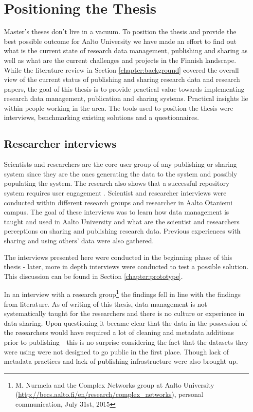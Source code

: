 \chapter{Positioning the Thesis}
\label{chapter:positioning}

Master's theses don't live in a vacuum. To position the thesis and provide the
best possible outcome for Aalto University we have made an effort to find out what
is the current state of research data management, publishing and sharing as well as what
are the current challenges and projects in the Finnish landscape. While the
literature review in Section \ref{chapter:background} covered the overall view
of the current status of publishing and sharing research data and research
papers, the goal of this thesis is to provide practical value towards implementing
research data management, publication and sharing systems. Practical
insights lie within people working in the area.
The tools used to position the thesis were interviews, benchmarking existing
solutions and a questionnaires.

\section{Researcher interviews}
\label{sec:expert_interviews}

Scientists and researchers are the core user group of any publishing or sharing
system since they are the ones generating the data to the system and possibly populating
the system. The research also shows that a successful repository system requires
user engagement \cite{DBLP:conf/ercimdl/Martinez-UribeM09}. Scientist and
researcher interviews were conducted within different research groups and
researcher in Aalto Otaniemi campus. The goal of these interviews was to learn
how data management is taught and used in Aalto University and what are the
scientist and researchers perceptions on sharing and publishing research data.
Previous experiences with sharing and using others' data were also gathered.

The interviews presented here were conducted in the beginning phase of this
thesis - later, more in depth interviews were conducted to test a possible
solution. This discussion can be found in Section \ref{chapter:prototype}.

In an interview with a research group\footnote{M. Nurmela and the Complex
Networks group at Aalto University (\url{http://becs.aalto.fi/en/research/complex\_networks}),
personal communication, July 31st, 2015} the findings fell in line with the
findings from literature. As of writing of this thesis, data management is not
systematically taught for the researchers and
there is no culture or experience in data sharing. Upon questioning it became
clear that the data in the possession of the researchers would have required
a lot of cleaning and metadata additions prior to publishing - this is no surprise
considering the fact that the datasets they were using were not designed to
go public in the first place. Though lack of metadata practices and lack of
publishing infrastructure were also brought up.

